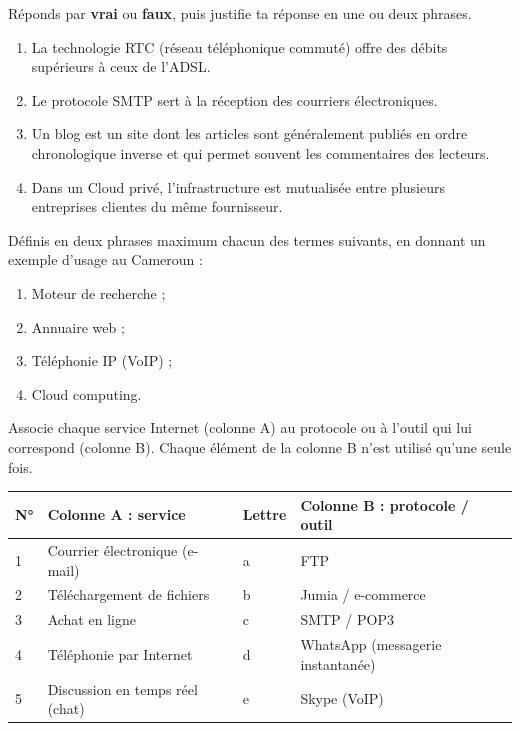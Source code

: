 \documentclass[11pt]{article}
\begin{document}
\begin{exercice}
Réponds par \textbf{vrai} ou \textbf{faux}, puis justifie ta réponse en une ou deux phrases.
\begin{enumerate}
    \item La technologie RTC (réseau téléphonique commuté) offre des débits supérieurs à ceux de l'ADSL.
    \item Le protocole SMTP sert à la réception des courriers électroniques.
    \item Un blog est un site dont les articles sont généralement publiés en ordre chronologique inverse et qui permet souvent les commentaires des lecteurs.
    \item Dans un Cloud privé, l'infrastructure est mutualisée entre plusieurs entreprises clientes du même fournisseur.
\end{enumerate}
\end{exercice}

\begin{exercice}
Définis en deux phrases maximum chacun des termes suivants, en donnant un exemple d'usage au Cameroun :
\begin{enumerate}
    \item Moteur de recherche ;
    \item Annuaire web ;
    \item Téléphonie IP (VoIP) ;
    \item Cloud computing.
\end{enumerate}
\end{exercice}

\begin{exercice}
Associe chaque service Internet (colonne A) au protocole ou à l'outil qui lui correspond (colonne B). Chaque élément de la colonne B n'est utilisé qu'une seule fois.
\begin{center}
\begin{tabularx}{\linewidth}{|l|X|l|X|}
\hline
\rowcolor{popblueL} \textbf{N°} & \textbf{Colonne A : service} & \textbf{Lettre} & \textbf{Colonne B : protocole / outil} \\
\hline
1 & Courrier électronique (e-mail) & a & FTP \\
\hline
2 & Téléchargement de fichiers & b & Jumia / e-commerce \\
\hline
3 & Achat en ligne & c & SMTP / POP3 \\
\hline
4 & Téléphonie par Internet & d & WhatsApp (messagerie instantanée) \\
\hline
5 & Discussion en temps réel (chat) & e & Skype (VoIP) \\
\hline
\end{tabularx}
\end{center}
\end{exercice}
\end{document}
